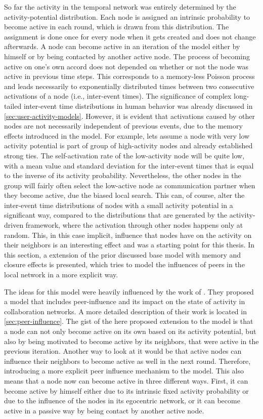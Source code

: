 So far the activity in the temporal network was entirely determined by the activity-potential distribution.
Each node is assigned an intrinsic probability to become active in each round, which is drawn from this distribution.
The assignment is done once for every node when it gets created and does not change afterwards.
A node can become active in an iteration of the model either by himself or by being contacted by another active node.
The process of becoming active on one's own accord does not depended on whether or not the node was active in previous time steps.
This corresponds to a memory-less Poisson process and leads necessarily to exponentially distributed times between two consecutive activations of a node (i.e., inter-event times).
The significance of complex long-tailed inter-event time distributions in human behavior was already discussed in \cref{sec:user-activity-models}.
However, it is evident that activations caused by other nodes are not necessarily independent of previous events, due to the memory effects introduced in the model.
For example, lets assume a node with very low activity potential is part of group of high-activity nodes and already established strong ties.
The self-activation rate of the low-activity node will be quite low, with a mean value and standard deviation for the inter-event times that is equal to the inverse of its activity probability.
Nevertheless, the other nodes in the group will fairly often select the low-active node as communication partner when they become active, due the biased local search.
This can, of course, alter the inter-event time distributions of nodes with a small activity potential in a significant way, compared to the distributions that are generated by the activity-driven framework, where the activation through other nodes happens only at random.
This, in this case implicit, influence that nodes have on the activity on their neighbors is an interesting effect and was a starting point for this thesis.
In this section, a extension of the prior discussed base model with memory and closure effects is presented, which tries to model the influences of peers in the local network in a more explicit way.

The ideas for this model were heavily influenced by the work of \citet{Walk2016}.
They proposed a model that includes peer-influence and its impact on the state of activity in collaboration networks.
A more detailed description of their work is located in \cref{sec:peer-influence}.
The gist of the here proposed extension to the model is that a node can not only become active on its own based on its activity potential, but also by being motivated to become active by its neighbors, that were active in the previous iteration.
Another way to look at it would be that active nodes can influence their neighbors to become active as well in the next round.
Therefore, introducing a more explicit peer influence mechanism to the model.
This also means that a node now can become active in three different ways.
First, it can become active by himself either due to its intrinsic fixed activity probability or due to the influence of the nodes in its egocentric network, or it can become active in a passive way by being contact by another active node.

